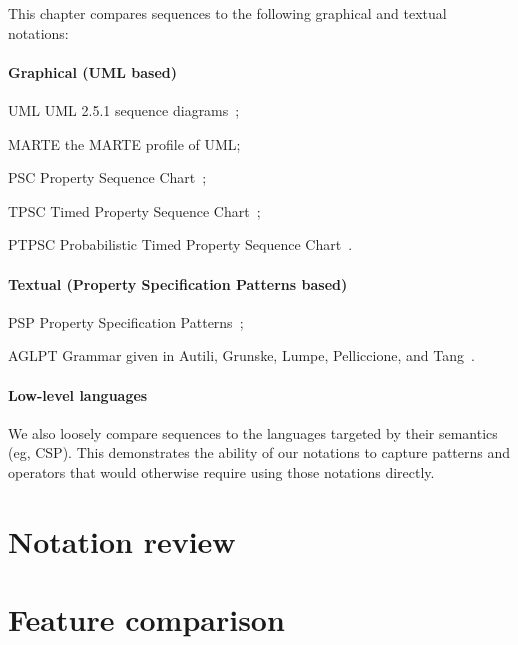 
This chapter compares \langname{} sequences to the following graphical
and textual notations:


\paragraph{Graphical (UML based)}

\begin{featset}
\item[UML] UML 2.5.1 sequence diagrams~\cite{uml251};
\item[MARTE] the MARTE profile of UML;
\item[PSC] Property Sequence Chart~\cite{psc};
\item[TPSC] Timed Property Sequence Chart~\cite{tpsc};
\item[PTPSC] Probabilistic Timed Property Sequence Chart~\cite{ptpsc}.
\end{featset}

\paragraph{Textual (Property Specification Patterns based)}

\begin{featset}
\item[PSP] Property Specification Patterns~\cite{psp,pspsite};
\item[AGLPT] Grammar given in Autili, Grunske, Lumpe, Pelliccione, and Tang~\cite{aglpt}.
\end{featset}

\paragraph{Low-level languages}
We also loosely compare \langname{} sequences to the languages targeted by their
semantics (eg, CSP).
This demonstrates the ability of our notations to
capture patterns and operators that would otherwise require using
those notations directly.

\section{Notation review}\label{sec:seq-comparison-review}


\section{Feature comparison}\label{sec:seq-comparison-features}



